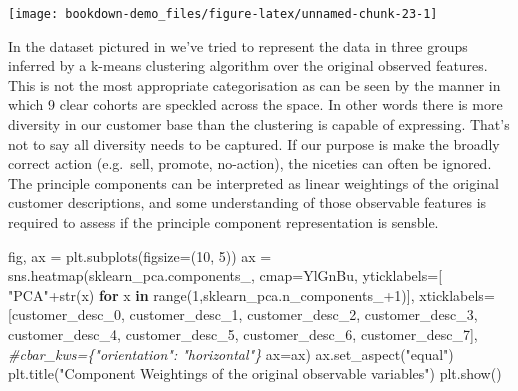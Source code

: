 \documentclass[]{tufte-book}
\newenvironment{Shaded}{}{}
\newcommand{\BuiltInTok}[1]{#1}
\newcommand{\CommentTok}[1]{\textcolor[rgb]{0.38,0.63,0.69}{\textit{#1}}}
\newcommand{\ControlFlowTok}[1]{\textcolor[rgb]{0.00,0.44,0.13}{\textbf{#1}}}
\newcommand{\DecValTok}[1]{\textcolor[rgb]{0.25,0.63,0.44}{#1}}
\newcommand{\KeywordTok}[1]{\textcolor[rgb]{0.00,0.44,0.13}{\textbf{#1}}}
\newcommand{\NormalTok}[1]{#1}
\newcommand{\OperatorTok}[1]{\textcolor[rgb]{0.40,0.40,0.40}{#1}}
\newcommand{\StringTok}[1]{\textcolor[rgb]{0.25,0.44,0.63}{#1}}
\theoremstyle{definition}
\theoremstyle{definition}
\theoremstyle{definition}
\theoremstyle{remark}
\begin{document}
\texttt{[image: bookdown-demo\_files/figure-latex/unnamed-chunk-23-1]}

In the dataset pictured in we've tried to represent the data in three groups inferred by a k-means clustering algorithm over the original observed features. This is not the most appropriate categorisation as can be seen by the manner in which 9 clear cohorts are speckled across the space. In other words there is more diversity in our customer base than the clustering is capable of expressing. That's not to say all diversity needs to be captured. If our purpose is make the broadly correct action (e.g.~sell, promote, no-action), the niceties can often be ignored. The principle components can be interpreted as linear weightings of the original customer descriptions, and some understanding of those observable features is required to assess if the principle component representation is sensble.

\begin{Shaded}
\begin{Highlighting}[]
\NormalTok{fig, ax }\OperatorTok{=}\NormalTok{ plt.subplots(figsize}\OperatorTok{=}\NormalTok{(}\DecValTok{10}\NormalTok{, }\DecValTok{5}\NormalTok{))}
\NormalTok{ax }\OperatorTok{=}\NormalTok{ sns.heatmap(sklearn\_pca.components\_,}
\NormalTok{                 cmap}\OperatorTok{=}\StringTok{\textquotesingle{}YlGnBu\textquotesingle{}}\NormalTok{,}
\NormalTok{                 yticklabels}\OperatorTok{=}\NormalTok{[ }\StringTok{"PCA"}\OperatorTok{+}\BuiltInTok{str}\NormalTok{(x) }\ControlFlowTok{for}\NormalTok{ x }\KeywordTok{in} \BuiltInTok{range}\NormalTok{(}\DecValTok{1}\NormalTok{,sklearn\_pca.n\_components\_}\OperatorTok{+}\DecValTok{1}\NormalTok{)],}
\NormalTok{  xticklabels}\OperatorTok{=}\NormalTok{[}\StringTok{\textquotesingle{}customer\_desc\_0\textquotesingle{}}\NormalTok{, }\StringTok{\textquotesingle{}customer\_desc\_1\textquotesingle{}}\NormalTok{, }\StringTok{\textquotesingle{}customer\_desc\_2\textquotesingle{}}\NormalTok{,}
  \StringTok{\textquotesingle{}customer\_desc\_3\textquotesingle{}}\NormalTok{, }\StringTok{\textquotesingle{}customer\_desc\_4\textquotesingle{}}\NormalTok{, }\StringTok{\textquotesingle{}customer\_desc\_5\textquotesingle{}}\NormalTok{,}
  \StringTok{\textquotesingle{}customer\_desc\_6\textquotesingle{}}\NormalTok{, }\StringTok{\textquotesingle{}customer\_desc\_7\textquotesingle{}}\NormalTok{],}
  \CommentTok{\#cbar\_kws=\{"orientation": "horizontal"\}}
\NormalTok{  ax}\OperatorTok{=}\NormalTok{ax)}
\NormalTok{ax.set\_aspect(}\StringTok{"equal"}\NormalTok{)}
\NormalTok{plt.title(}\StringTok{"Component Weightings of the original observable variables"}\NormalTok{)}
\NormalTok{plt.show()}
\end{Highlighting}
\end{Shaded}
\end{document}
